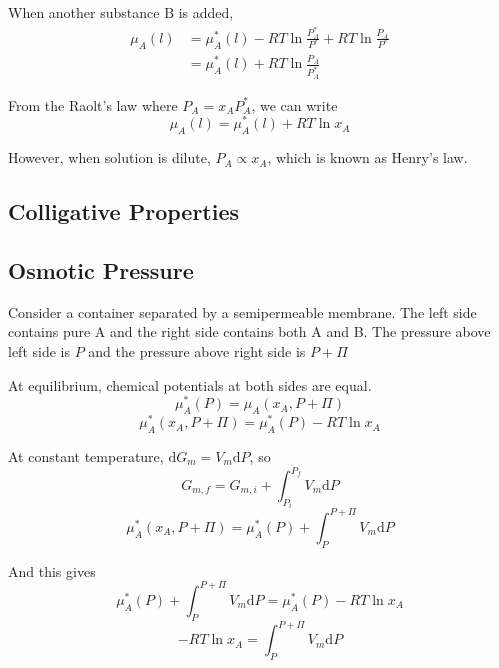 \documentclass[letterpaper]{article}
\newcommand{\diff}{\mathrm{d}}
\newcommand{\zero}{^\circ}
\begin{document}
When another substance B is added,
\begin{equation*}
    \begin{aligned}
        \mu_A(l) & =\mu_A^*(l)-RT\ln\frac{P_A^*}{P\zero}+RT\ln\frac{P_A}{P\zero} \\
                 & =\mu_A^*(l)+RT\ln\frac{P_A}{P_A^*}
    \end{aligned}
\end{equation*}

From the Raolt's law where $P_A=x_AP_A^*$, we can write
\begin{equation*}
    \mu_A(l)=\mu_A^*(l)+RT\ln x_A
\end{equation*}

However, when solution is dilute, $P_A\propto x_A$, which is known as Henry's law.

\subsection*{Colligative Properties}


\subsection*{Osmotic Pressure}
Consider a container separated by a semipermeable membrane. The left side contains pure A
and the right side contains both A and B. The pressure above left side is $P$ and the pressure
above right side is $P+\Pi$

At equilibrium, chemical potentials at both sides are equal.
\begin{equation*}
    \mu_A^*(P)=\mu_A\left(x_A,P+\Pi\right)
\end{equation*}
\begin{equation*}
    \mu_A^*\left(x_A,P+\Pi\right)=\mu_A^*(P)-RT\ln x_A
\end{equation*}

At constant temperature, $\diff G_m=V_m\diff P$, so
\begin{equation*}
    G_{m,f}=G_{m,i}+\int_{P_i}^{P_f}V_m\diff P
\end{equation*}
\begin{equation*}
    \mu_A^*\left(x_A,P+\Pi\right)=\mu_A^*(P)+\int_{P}^{P+\Pi}V_m\diff P
\end{equation*}

And this gives
\begin{equation*}
    \mu_A^*(P)+\int_{P}^{P+\Pi}V_m\diff P=\mu_A^*(P)-RT\ln x_A
\end{equation*}
\begin{equation*}
    -RT\ln x_A=\int_{P}^{P+\Pi}V_m\diff P
\end{equation*}
\end{document}
